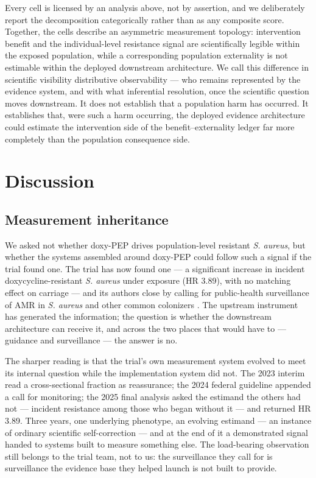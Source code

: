 \documentclass[10pt,letterpaper]{article}
\begin{document}
Every cell is licensed by an analysis above, not by assertion, and we
deliberately report the decomposition categorically rather than as any
composite score. Together, the cells describe an asymmetric measurement
topology: intervention benefit and the individual-level resistance
signal are scientifically legible within the exposed population, while a
corresponding population externality is not estimable within the
deployed downstream architecture. We call this difference in scientific
visibility distributive observability --- who remains
represented by the evidence system, and with what inferential
resolution, once the scientific question moves downstream. It does not
establish that a population harm has occurred. It establishes that, were
such a harm occurring, the deployed evidence architecture could estimate
the intervention side of the benefit--externality ledger far more
completely than the population consequence side.

\section*{Discussion}

\subsection*{Measurement inheritance}

We asked not whether doxy-PEP drives population-level resistant \emph{S.
aureus}, but whether the systems assembled around doxy-PEP could follow
such a signal if the trial found one. The trial has now found one --- a
significant increase in incident doxycycline-resistant \emph{S. aureus}
under exposure (HR 3.89), with no matching effect on carriage --- and
its authors close by calling for public-health surveillance of AMR in
\emph{S. aureus} and other common colonizers \cite{luetkemeyer2025}.
The upstream instrument has generated the information; the question is
whether the downstream architecture can receive it, and across the two
places that would have to --- guidance and surveillance --- the answer
is no.

The sharper reading is that the trial's own measurement system evolved
to meet its internal question while the implementation system did not.
The 2023 interim read a cross-sectional fraction as reassurance; the
2024 federal guideline appended a call for monitoring; the 2025 final
analysis asked the estimand the others had not --- incident resistance
among those who began without it --- and returned HR 3.89. Three years,
one underlying phenotype, an evolving estimand --- an instance of ordinary
scientific self-correction --- and at the end of it a demonstrated
signal handed to systems built to measure something else. The
load-bearing observation still belongs to the trial team, not to us: the
surveillance they call for is surveillance the evidence base they helped
launch is not built to provide.
\end{document}
